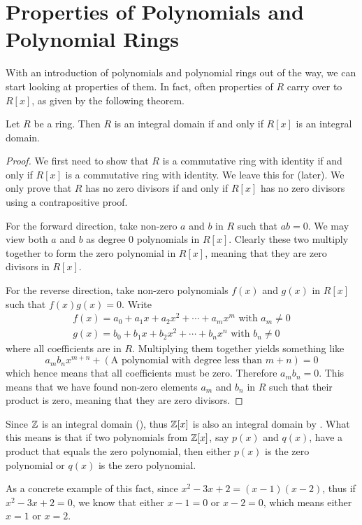 \newpage

\section{Properties of Polynomials and Polynomial Rings}
With an introduction of polynomials and polynomial rings out of the way, we can start looking at properties of them. In fact, often properties of $R$ carry over to $R[x]$, as given by the following theorem.

\begin{theorem}\label{thrm-integral-domain-iff-polynomial-ring-is-integral-domain}
    Let $R$ be a ring. Then $R$ is an integral domain if and only if $R[x]$ is an integral domain.
\end{theorem}
\begin{proof}
    We first need to show that $R$ is a commutative ring with identity if and only if $R[x]$ is a commutative ring with identity. We leave this for  (later). We only prove that $R$ has no zero divisors if and only if $R[x]$ has no zero divisors using a contrapositive proof.

    For the forward direction, take non-zero $a$ and $b$ in $R$ such that $ab = 0$. We may view both $a$ and $b$ as degree 0 polynomials in $R[x]$. Clearly these two multiply together to form the zero polynomial in $R[x]$, meaning that they are zero divisors in $R[x]$.

    For the reverse direction, take non-zero polynomials $f(x)$ and $g(x)$ in $R[x]$ such that $f(x)g(x) = 0$. Write
    \begin{align*}
        f(x) = a_0+a_1x+a_2x^2+\cdots+a_mx^m \text{ with } a_m \neq 0\\
        g(x) = b_0+b_1x+b_2x^2+\cdots+b_nx^n \text{ with } b_n \neq 0
    \end{align*}
    where all coefficients are in $R$. Multiplying them together yields something like
    \[
        a_mb_nx^{m+n} + (\text{A polynomial with degree less than }m+n) = 0
    \]
    which hence means that all coefficients must be zero. Therefore $a_mb_n = 0$. This means that we have found non-zero elements $a_m$ and $b_n$ in $R$ such that their product is zero, meaning that they are zero divisors.
\end{proof}

\begin{example}
    Since $\mathbb{Z}$ is an integral domain (), thus $\mathbb{Z}[x]$ is also an integral domain by . What this means is that if two polynomials from $\mathbb{Z}[x]$, say $p(x)$ and $q(x)$, have a product that equals the zero polynomial, then either $p(x)$ is the zero polynomial or $q(x)$ is the zero polynomial.

    As a concrete example of this fact, since $x^2-3x+2 = (x-1)(x-2)$, thus if $x^2-3x+2 = 0$, we know that either $x-1 = 0$ or $x-2 = 0$, which means either $x = 1$ or $x = 2$.
\end{example}

